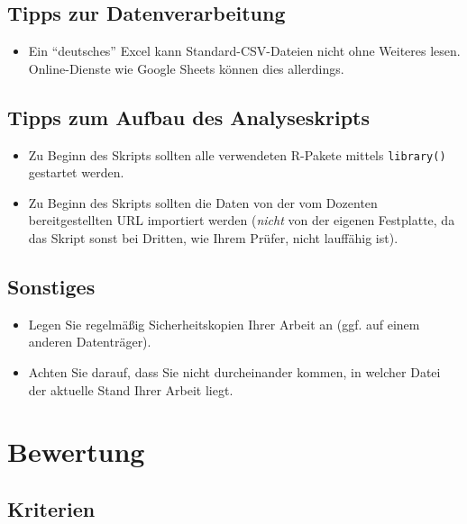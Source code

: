 \documentclass[
]{book}
\providecommand{\tightlist}{%
  \setlength{\itemsep}{0pt}\setlength{\parskip}{0pt}}
\begin{document}
\hypertarget{tipps-zur-datenverarbeitung}{%
\subsection{Tipps zur Datenverarbeitung}\label{tipps-zur-datenverarbeitung}}

\begin{itemize}
\tightlist
\item
  Ein ``deutsches'' Excel kann Standard-CSV-Dateien nicht ohne Weiteres lesen. Online-Dienste wie Google Sheets können dies allerdings.
\end{itemize}

\hypertarget{tipps-zum-aufbau-des-analyseskripts}{%
\subsection{Tipps zum Aufbau des Analyseskripts}\label{tipps-zum-aufbau-des-analyseskripts}}

\begin{itemize}
\item
  Zu Beginn des Skripts sollten alle verwendeten R-Pakete mittels \texttt{library()} gestartet werden.
\item
  Zu Beginn des Skripts sollten die Daten von der vom Dozenten bereitgestellten URL importiert werden (\emph{nicht} von der eigenen Festplatte, da das Skript sonst bei Dritten, wie Ihrem Prüfer, nicht lauffähig ist).
\end{itemize}

\hypertarget{sonstiges}{%
\subsection{Sonstiges}\label{sonstiges}}

\begin{itemize}
\item
  Legen Sie regelmäßig Sicherheitskopien Ihrer Arbeit an (ggf. auf einem anderen Datenträger).
\item
  Achten Sie darauf, dass Sie nicht durcheinander kommen, in welcher Datei der aktuelle Stand Ihrer Arbeit liegt.
\end{itemize}

\hypertarget{bewertung}{%
\section{Bewertung}\label{bewertung}}

\hypertarget{kriterien}{%
\subsection{Kriterien}\label{kriterien}}
\end{document}
